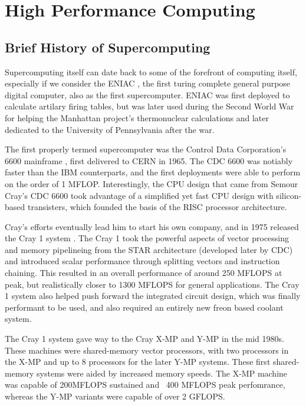 \section{High Performance Computing}
\label{sec:hpc}


\subsection{Brief History of Supercomputing}

Supercomputing itself can date back to some of the forefront of computing itself, especially if we consider the ENIAC \cite{}, the first turing complete general purpose digital computer, also as the first supercomputer.  ENIAC was first deployed to calculate artilary firing tables, but was later used during the Second World War for helping the Manhattan project's thermonuclear calculations and later dedicated to the University of Pennsylvania after the war. 

The first properly termed supercomputer was the Control Data Corporation's  6600 mainframe \cite{}, first delivered to CERN in 1965. The CDC 6600 was notiably faster than the IBM counterparts, and the first deployments were able to perform on the order of 1 MFLOP. Interestingly, the CPU design that came from Semour Cray's  CDC 6600 took advantage of a simplified yet fast CPU design with silicon-based transisters, which founded the basis of the RISC processor architecture. 


Cray's efforts eventually lead him to start his own company, and in 1975 released the Cray 1 system \cite{}. The Cray 1 took the powerful aspects of vector processing and memory pipelineing from the STAR architecture (developed later by CDC) and introduced scalar performance through splitting vectors and instruction chaining. This resulted in an overall performance of around 250 MFLOPS at peak, but realistically closer to 1300 MFLOPS for general applications.  The Cray 1 system also helped push forward the integrated circuit design, which was finally performant to be used, and also required an entirely new freon based coolant system.

The Cray 1 system gave way to the Cray X-MP and Y-MP in the mid 1980s. These machines were shared-memory vector processors, with two processors in the X-MP and up to 8 processors for the later Y-MP systems. These first shared-memory systems were aided by increased memory speeds. The X-MP machine was capable of 200MFLOPS sustained and ~400 MFLOPS peak perfomrance, whereas the Y-MP variants were capable of over 2 GFLOPS. 

